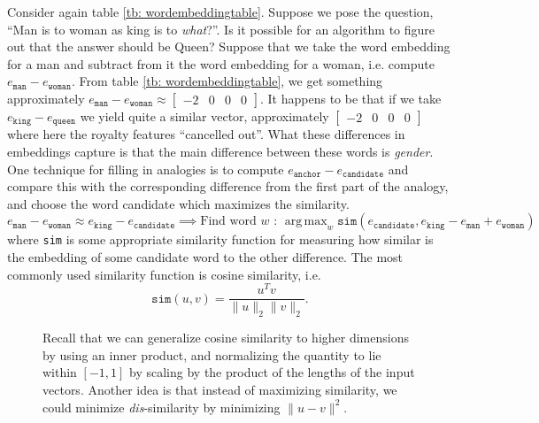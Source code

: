 \documentclass[12pt]{article}
\DeclareMathOperator*{\argmax}{arg\,max}
\begin{document}
Consider again table \ref{tb: wordembeddingtable}. Suppose we pose the question, ``Man is to woman as king is to \emph{what}?''. Is it possible for an algorithm to figure out that the answer should be Queen?
Suppose that we take the word embedding for a man and subtract from it the word embedding for a woman, i.e. compute $e_{\texttt{man}} - e_{\texttt{woman}}$. From table \ref{tb: wordembeddingtable}, we get something approximately
$e_{\texttt{man}} - e_{\texttt{woman}} \approx \begin{bmatrix} -2 & 0 & 0 & 0 \end{bmatrix}$. It happens to be that if we take $e_{\texttt{king}} - e_{\texttt{queen}}$ we yield quite a similar vector, approximately $\begin{bmatrix} -2 & 0 & 0 & 0 \end{bmatrix}$ where here the royalty features ``cancelled out''. What these differences in embeddings capture is that the main difference between these words is \emph{gender}. One technique for filling in analogies is to compute $e_{\texttt{anchor}} - e_{\texttt{candidate}}$ and compare this with the corresponding difference from the first part of the analogy, and choose the word candidate which maximizes the similarity.
\[
e_{\texttt{man}} - e_{\texttt{woman}} \approx e_{\texttt{king}} - e_{\texttt{candidate}} \implies \textrm{Find word $w$ : } \argmax_w \texttt{sim}\left(e_\texttt{candidate}, e_{\texttt{king}} - e_{\texttt{man}} + e_{\texttt{woman}}\right)
\]
where \texttt{sim} is some appropriate similarity function for measuring how similar is the embedding of some candidate word to the other difference. The most commonly used similarity function is cosine similarity, i.e.
\[
\texttt{sim}(u,v) = \frac{u^Tv}{\|u\|_2 \|v\|_2}.
\]
\begin{figure}[h]
  \centering
\caption{\footnotesize Recall that we can generalize cosine similarity to higher dimensions by using an inner product, and normalizing the quantity to lie within $[-1, 1]$ by scaling by the product of the lengths of the input vectors. Another idea is that instead of maximizing similarity, we could minimize \emph{dis}-similarity by minimizing $\|u-v\|^2$.}
\end{figure}
\end{document}
